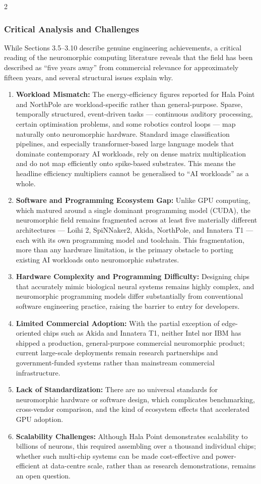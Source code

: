 \begin{multicols}{2}
  \subsubsection*{Critical Analysis and Challenges}
  While Sections 3.5–3.10 describe genuine engineering achievements, a critical reading of the neuromorphic computing literature reveals that the field has been described as “five years away” from commercial relevance for approximately fifteen years, and several structural issues explain why.
  \begin{enumerate}\justifying
    \item \textbf{Workload Mismatch:} The energy-efficiency figures reported for Hala Point and NorthPole are workload-specific rather than general-purpose. Sparse, temporally structured, event-driven tasks — continuous auditory processing, certain optimisation problems, and some robotics control loops — map naturally onto neuromorphic hardware. Standard image classification pipelines, and especially transformer-based large language models that dominate contemporary AI workloads, rely on dense matrix multiplication and do not map efficiently onto spike-based substrates. This means the headline efficiency multipliers cannot be generalised to “AI workloads” as a whole.
    \item \textbf{Software and Programming Ecosystem Gap:} Unlike GPU computing, which matured around a single dominant programming model (CUDA), the neuromorphic field remains fragmented across at least five materially different architectures — Loihi 2, SpiNNaker2, Akida, NorthPole, and Innatera T1 — each with its own programming model and toolchain. This fragmentation, more than any hardware limitation, is the primary obstacle to porting existing AI workloads onto neuromorphic substrates.
    \item \textbf{Hardware Complexity and Programming Difficulty:} Designing chips that accurately mimic biological neural systems remains highly complex, and neuromorphic programming models differ substantially from conventional software engineering practice, raising the barrier to entry for developers.
    \item \textbf{Limited Commercial Adoption:} With the partial exception of edge-oriented chips such as Akida and Innatera T1, neither Intel nor IBM has shipped a production, general-purpose commercial neuromorphic product; current large-scale deployments remain research partnerships and government-funded systems rather than mainstream commercial infrastructure.
    \item \textbf{Lack of Standardization:} There are no universal standards for neuromorphic hardware or software design, which complicates benchmarking, cross-vendor comparison, and the kind of ecosystem effects that accelerated GPU adoption.
    \item \textbf{Scalability Challenges:} Although Hala Point demonstrates scalability to billions of neurons, this required assembling over a thousand individual chips; whether such multi-chip systems can be made cost-effective and power-efficient at data-centre scale, rather than as research demonstrations, remains an open question.
  \end{enumerate}


\end{multicols}
